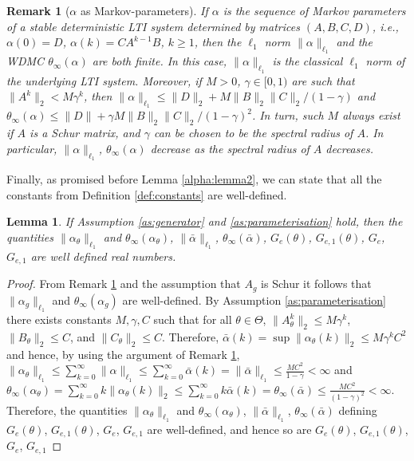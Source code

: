 \documentclass{article}
\newtheorem{lemma}[theorem]{Lemma}
\newtheorem{remark}[theorem]{Remark}
\begin{document}
\begin{remark}[$\alpha$ as Markov-parameters]
    \label{norms:rem}
   If $\alpha$ is the sequence of Markov parameters of a stable deterministic LTI system  determined
  by matrices $(A,B,C,D)$, i.e.,
  $\alpha(0)=D$, $\alpha(k)=CA^{k-1}B$, $k \ge 1$, then the $\ell_1$ norm $\|\alpha\|_{\ell_1}$ and the WDMC $\theta_{\infty}(\alpha)$ are both finite. In this case,
  $\|\alpha\|_{\ell_1}$ is the classical $\ell_1$ norm of the underlying LTI system.  
  Moreover, if $M >0$, $\gamma \in [0,1)$ are such that
  $\|A^k\|_2 < M \gamma^k$, then 
  $\|\alpha\|_{\ell_1} \le \|D\|_2+M\|B\|_2\|C\|_2/(1-\gamma)$ and 
  $\theta_{\infty}(\alpha) \le \|D\|+ \gamma M\|B\|_2\|C\|_2/(1-\gamma)^2$.
  In turn, such $M$
  always exist if $A$ is a Schur matrix, and $\gamma$ can be chosen to be 
  the spectral radius of $A$. In particular, $\|\alpha\|_{\ell_1}$, $\theta_{\infty}(\alpha)$
  decrease as the spectral radius of $A$ decreases.
  \end{remark}
  Finally, as promised before Lemma \ref{alpha:lemma2}, we can state that all the
  constants from Definition \ref{def:constants} are well-defined. 
\begin{lemma}
\label{alpha:lemma1.5}
  If Assumption \ref{as:generator} and \ref{as:parameterisation} hold, then
  the quantities $\|\alpha_{\theta}\|_{\ell_1}$ and $\theta_{\infty}(\alpha_{\theta})$, $\|\bar{\alpha}\|_{\ell_1}$,
  $\theta_{\infty}(\bar{\alpha})$, $G_e(\theta)$, $G_{e,1}(\theta)$, $G_e$, $G_{e,1}$ are well defined 
  real numbers. 
\end{lemma}
\begin{proof}
  From Remark \ref{norms:rem} and the assumption that $A_g$ is Schur it follows that 
  $\|\alpha_g\|_{\ell_1}$ and $\theta_{\infty}(\alpha_g)$ are well-defined. 
   By Assumption \ref{as:parameterisation} there exists constants $M,\gamma,C$ such that 
   for all $\theta \in \Theta$, $\|A_{\theta}^k\|_2 \le M \gamma^k$, $\|B_{\theta}\|_2 \le C$, and $\|C_{\theta}\|_2 \le C$. 
   Therefore, $\bar{\alpha}(k)=\sup \|\alpha_{\theta}(k)\|_2 \le M \gamma^k C^2$ and hence,
   by using the argument of Remark \ref{norms:rem},  
   $\|\alpha_{\theta}\|_{\ell_1} \le \sum_{k=0}^{\infty} \|\alpha\|_{\ell_1} \le  \sum_{k=0}^{\infty} \bar{\alpha}(k)=\|\bar{\alpha}\|_{\ell_1} \le \frac{MC^2}{1-\gamma} < \infty$ and
   $\theta_{\infty}(\alpha_{\theta})=\sum_{k=0}^{\infty} k \|\alpha_{\theta}(k)\|_2 \le \sum_{k=0}^{\infty} k \bar{\alpha}(k)=\theta_{\infty}(\bar{\alpha}) \le \frac{MC^2}{(1-\gamma)^2} < \infty$.
   Therefore, the quantities $\|\alpha_{\theta}\|_{\ell_1}$ and $\theta_{\infty}(\alpha_{\theta})$, $\|\bar{\alpha}\|_{\ell_1}$,
   $\theta_{\infty}(\bar{\alpha})$ defining $G_e(\theta)$, $G_{e,1}(\theta)$, $G_e$, $G_{e,1}$
   are well-defined, and hence so are $G_e(\theta)$, $G_{e,1}(\theta)$, $G_e$, $G_{e,1}$
\end{proof}
\end{document}
